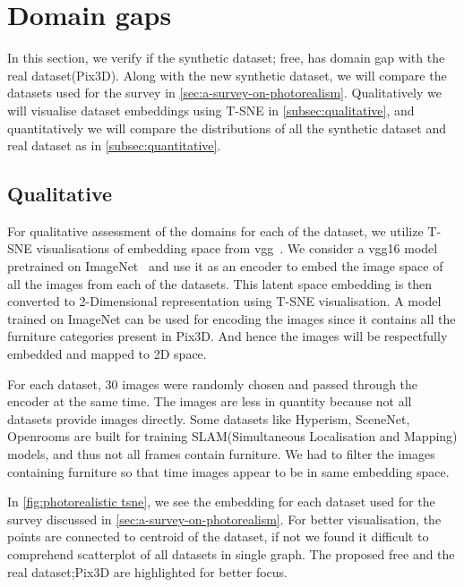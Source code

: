 \section{Domain gaps}\label{sec:domain-gaps}

In this section, we verify if the synthetic dataset;
\gls{free}, has domain gap with the real dataset(Pix3D).
Along with the new synthetic dataset, we will compare the datasets used for the survey in \autoref{sec:a-survey-on-photorealism}.
Qualitatively we will visualise dataset embeddings using T-SNE in \autoref{subsec:qualitative}, and quantitatively we will compare the distributions of all the synthetic dataset and real dataset as in \autoref{subsec:quantitative}.

\subsection{Qualitative}\label{subsec:qualitative}

For qualitative assessment of the domains for each of the dataset, we utilize T-SNE visualisations of embedding space from \gls{vgg}~\cite{simonyan2015deep}.
We consider a \gls{vgg}16 model pretrained on ImageNet~\cite{Deng2009ImageNetAL} and use it as an encoder to embed the image space of all the images from each of the datasets.
This latent space embedding is then converted to 2-Dimensional representation using T-SNE visualisation.
A model trained on ImageNet can be used for encoding the images since it contains all the furniture categories present in Pix3D\@.
And hence the images will be respectfully embedded and mapped to 2D space.

For each dataset, 30 images were randomly chosen and passed through the encoder at the same time.
The images are less in quantity because not all datasets provide images directly.
Some datasets like Hyperism, SceneNet, Openrooms are built for training SLAM(Simultaneous Localisation and Mapping) models, and thus not all frames contain furniture.
We had to filter the images containing furniture so that time images appear to be in same embedding space.

In \autoref{fig:photorealistic tsne}, we see the embedding for each dataset used for the survey discussed in \autoref{sec:a-survey-on-photorealism}.
For better visualisation, the points are connected to centroid of the dataset,
if not we found it difficult to comprehend scatterplot of all datasets in single graph.
The proposed \gls{free} and the real dataset;Pix3D are highlighted for better focus.

